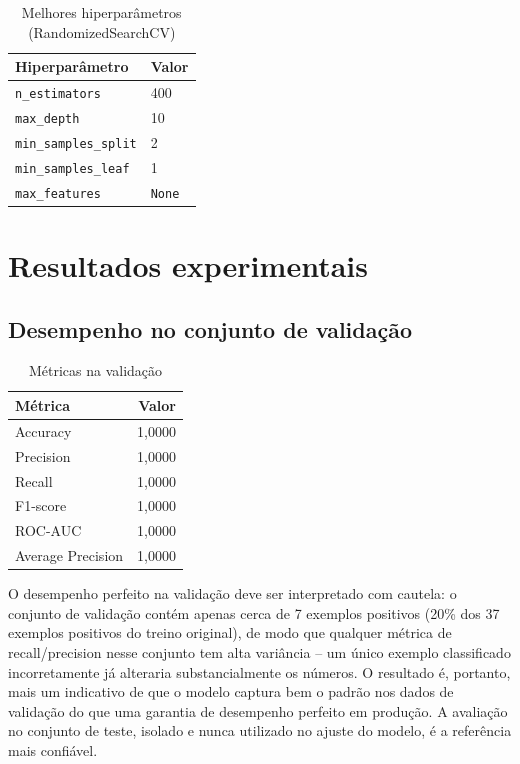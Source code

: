 \documentclass[12pt,a4paper]{article}
\begin{document}
\begin{table}[H]
\centering
\caption{Melhores hiperparâmetros (RandomizedSearchCV)}
\begin{tabular}{ll}
\toprule
\textbf{Hiperparâmetro} & \textbf{Valor} \\
\midrule
\texttt{n\_estimators} & 400 \\
\texttt{max\_depth} & 10 \\
\texttt{min\_samples\_split} & 2 \\
\texttt{min\_samples\_leaf} & 1 \\
\texttt{max\_features} & \texttt{None} \\
\bottomrule
\end{tabular}
\end{table}

\newpage


\section{Resultados experimentais}

\subsection{Desempenho no conjunto de validação}

\begin{table}[H]
\centering
\caption{Métricas na validação}
\begin{tabular}{lr}
\toprule
\textbf{Métrica} & \textbf{Valor} \\
\midrule
Accuracy & 1{,}0000 \\
Precision & 1{,}0000 \\
Recall & 1{,}0000 \\
F1-score & 1{,}0000 \\
ROC-AUC & 1{,}0000 \\
Average Precision & 1{,}0000 \\
\bottomrule
\end{tabular}
\end{table}

O desempenho perfeito na validação deve ser interpretado com cautela: o conjunto de validação contém apenas cerca de 7 exemplos positivos (20\% dos 37 exemplos positivos do treino original), de modo que qualquer métrica de recall/precision nesse conjunto tem alta variância -- um único exemplo classificado incorretamente já alteraria substancialmente os números. O resultado é, portanto, mais um indicativo de que o modelo captura bem o padrão nos dados de validação do que uma garantia de desempenho perfeito em produção. A avaliação no conjunto de teste, isolado e nunca utilizado no ajuste do modelo, é a referência mais confiável.
\end{document}
